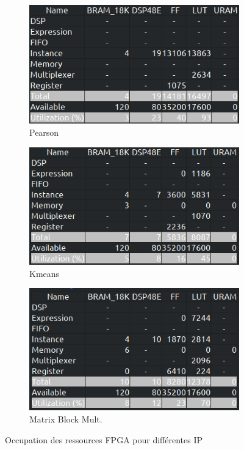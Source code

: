 \documentclass[12pt,a4paper]{ieee}
\begin{document}
\begin{figure}[H]
	\centering
	\begin{subfigure}[H]{.31\linewidth}
		\centering
		\includegraphics[width=\linewidth]{hls_fig/screenshot001}
		\caption{Pearson}
	\end{subfigure}
	\begin{subfigure}[H]{.31\linewidth}
		\centering
		\includegraphics[width=\linewidth]{hls_fig/screenshot002}
		\caption{Kmeans}
	\end{subfigure}
	\begin{subfigure}[H]{.31\linewidth}
		\centering
		\includegraphics[width=\linewidth]{hls_fig/screenshot003}
		\caption{Matrix Block Mult.}
	\end{subfigure}	
	\caption{Occupation des ressources FPGA pour différentes IP}
	\label{fig-hls}
\end{figure}
\end{document}

